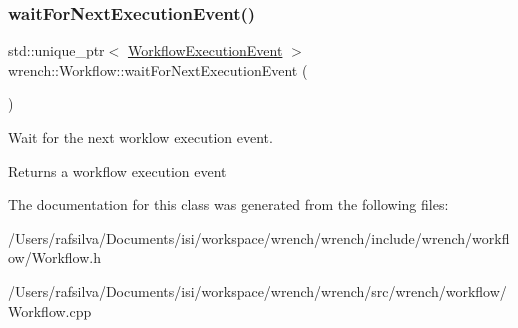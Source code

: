 \subsubsection{\texorpdfstring{wait\+For\+Next\+Execution\+Event()}{waitForNextExecutionEvent()}}
{\footnotesize\ttfamily std\+::unique\+\_\+ptr$<$ \hyperlink{classwrench_1_1_workflow_execution_event}{Workflow\+Execution\+Event} $>$ wrench\+::\+Workflow\+::wait\+For\+Next\+Execution\+Event (\begin{DoxyParamCaption}{ }\end{DoxyParamCaption})}



Wait for the next worklow execution event. 

\begin{DoxyReturn}{Returns}
a workflow execution event 
\end{DoxyReturn}


The documentation for this class was generated from the following files\+:\begin{DoxyCompactItemize}
\item 
/\+Users/rafsilva/\+Documents/isi/workspace/wrench/wrench/include/wrench/workflow/Workflow.\+h\item 
/\+Users/rafsilva/\+Documents/isi/workspace/wrench/wrench/src/wrench/workflow/Workflow.\+cpp\end{DoxyCompactItemize}
